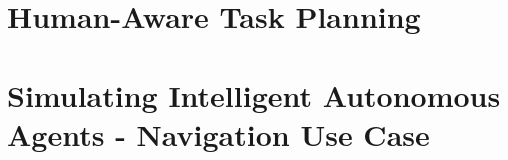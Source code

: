 \documentclass[english,a4paper,12pt,twoside]{StyleThese}
\begin{document}



\cleardoublepage %

\dominitoc
{}

\cleardoublepage %

%

\cleardoublepage



\newpage
\thispagestyle{empty}
\mbox{}

\tableofcontents

\printnoidxglossary[type=\acronymtype]
%

\mainmatter



\newpage
\thispagestyle{empty}
\mbox{}

\part{Human-Aware Task Planning} \label{part:1}






\part{Simulating Intelligent Autonomous Agents - Navigation Use Case} \label{part:2}


\end{document}
